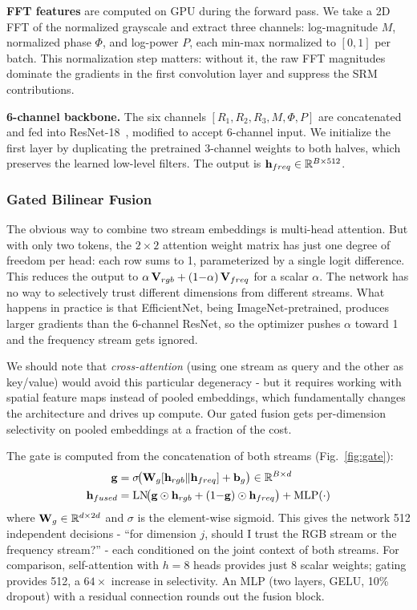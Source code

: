 \textbf{FFT features} are computed on GPU during the forward pass. We take a 2D FFT of the normalized grayscale and extract three channels: log-magnitude $M$, normalized phase $\Phi$, and log-power $P$, each min-max normalized to $[0, 1]$ per batch. This normalization step matters: without it, the raw FFT magnitudes dominate the gradients in the first convolution layer and suppress the SRM contributions.

\textbf{6-channel backbone.} The six channels $[R_1, R_2, R_3, M, \Phi, P]$ are concatenated and fed into ResNet-18~\cite{he2016resnet}, modified to accept 6-channel input. We initialize the first layer by duplicating the pretrained 3-channel weights to both halves, which preserves the learned low-level filters. The output is $\mathbf{h}_{freq} \in \mathbb{R}^{B \times 512}$.

\subsubsection{Gated Bilinear Fusion}
\label{sec:gated_fusion}

The obvious way to combine two stream embeddings is multi-head attention. But with only two tokens, the $2\!\times\!2$ attention weight matrix has just one degree of freedom per head: each row sums to 1, parameterized by a single logit difference. This reduces the output to $\alpha\,\mathbf{V}_{rgb} + (1{-}\alpha)\,\mathbf{V}_{freq}$ for a scalar $\alpha$. The network has no way to selectively trust different dimensions from different streams. What happens in practice is that EfficientNet, being ImageNet-pretrained, produces larger gradients than the 6-channel ResNet, so the optimizer pushes $\alpha$ toward 1 and the frequency stream gets ignored.

We should note that \textit{cross-attention} (using one stream as query and the other as key/value) would avoid this particular degeneracy - but it requires working with spatial feature maps instead of pooled embeddings, which fundamentally changes the architecture and drives up compute. Our gated fusion gets per-dimension selectivity on pooled embeddings at a fraction of the cost.

The gate is computed from the concatenation of both streams (Fig.~\ref{fig:gate}):
\begin{align}
    \mathbf{g} &= \sigma\!\big(\mathbf{W}_g [\mathbf{h}_{rgb} \| \mathbf{h}_{freq}] + \mathbf{b}_g\big) \in \mathbb{R}^{B \times d} \label{eq:gate}\\
    \mathbf{h}_{fused} &= \text{LN}\!\big(\mathbf{g} \odot \mathbf{h}_{rgb} + (1{-}\mathbf{g}) \odot \mathbf{h}_{freq}\big) + \text{MLP}(\cdot) \label{eq:fused}
\end{align}
where $\mathbf{W}_g \in \mathbb{R}^{d \times 2d}$ and $\sigma$ is the element-wise sigmoid. This gives the network 512 independent decisions - ``for dimension $j$, should I trust the RGB stream or the frequency stream?'' - each conditioned on the joint context of both streams. For comparison, self-attention with $h = 8$ heads provides just 8 scalar weights; gating provides 512, a $64\times$ increase in selectivity. An MLP (two layers, GELU, 10\% dropout) with a residual connection rounds out the fusion block.

